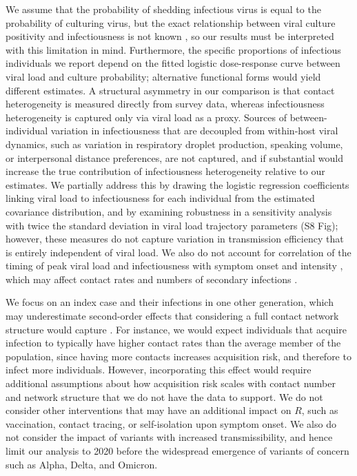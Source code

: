 \documentclass[
  10pt,
  letterpaper,
]{article}
\begin{document}
We assume that the probability of shedding infectious virus is equal to
the probability of culturing virus, but the exact relationship between
viral culture positivity and infectiousness is not known
\citep{puhach2023}, so our results must be interpreted with this
limitation in mind. Furthermore, the specific proportions of infectious
individuals we report depend on the fitted logistic dose-response curve
between viral load and culture probability; alternative functional forms
would yield different estimates. A structural asymmetry in our
comparison is that contact heterogeneity is measured directly from
survey data, whereas infectiousness heterogeneity is captured only via
viral load as a proxy. Sources of between-individual variation in
infectiousness that are decoupled from within-host viral dynamics, such
as variation in respiratory droplet production, speaking volume, or
interpersonal distance preferences, are not captured, and if substantial
would increase the true contribution of infectiousness heterogeneity
relative to our estimates. We partially address this by drawing the
logistic regression coefficients linking viral load to infectiousness
for each individual from the estimated covariance distribution, and by
examining robustness in a sensitivity analysis with twice the standard
deviation in viral load trajectory parameters (S8 Fig); however, these
measures do not capture variation in transmission efficiency that is
entirely independent of viral load. We also do not account for
correlation of the timing of peak viral load and infectiousness with
symptom onset and intensity \citep{marks2021}, which may affect contact
rates and numbers of secondary infections \citep{marc2021}.

We focus on an index case and their infections in one other generation,
which may underestimate second-order effects that considering a full
contact network structure would capture \citep{ke2022}. For instance, we
would expect individuals that acquire infection to typically have higher
contact rates than the average member of the population, since having
more contacts increases acquisition risk, and therefore to infect more
individuals. However, incorporating this effect would require additional
assumptions about how acquisition risk scales with contact number and
network structure that we do not have the data to support. We do not
consider other interventions that may have an additional impact on
\(R\), such as vaccination, contact tracing, or self-isolation upon
symptom onset. We also do not consider the impact of variants with
increased transmissibility, and hence limit our analysis to 2020 before
the widespread emergence of variants of concern such as Alpha, Delta,
and Omicron.
\end{document}
